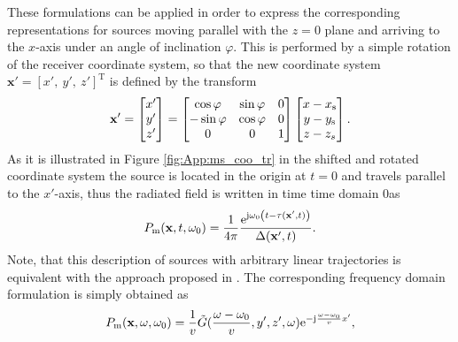 These formulations can be applied in order to express the corresponding representations for sources moving parallel with the $z=0$ plane and arriving to the $x$-axis under an angle of inclination $\varphi$.
This is performed by a simple rotation of the receiver coordinate system, so that the new coordinate system $\mathbf{x'}= [x',\ y',\ z']^{\mathrm{T}}$ is defined by the transform
%
\begin{equation}
\mathbf{x}'=
\begin{bmatrix} x' \\ y' \\ z' \end{bmatrix}
=
\begin{bmatrix}
\cos\varphi  &  \sin\varphi & 0\\
-\sin\varphi & \cos\varphi &0\\
0       &   0 &   1
\end{bmatrix}
\begin{bmatrix} x-x_\mathrm{s} \\ y-y_\mathrm{s} \\ z -z_s \end{bmatrix}.
\label{eq:transform_matrix}
\end{equation} 
%
As it is illustrated in Figure \ref{fig:App:ms_coo_tr} in the shifted and rotated coordinate system the source is located in the origin at $t = 0$ and travels parallel to the $x'$-axis, thus the radiated field is written in time time domain 0as
\begin{equation}
P_{\mathrm{m}}(\mathbf{x},t,\omega_0) = \frac{1}{4\pi} \frac{\mathrm{e}^{\mathrm{j} \omega_0 \left(t - \tau(\mathbf{x}',t) \right)}}{\Delta(\mathbf{x}',t)}.
\label{eq:inclined_field}
\end{equation}
Note, that this description of sources with arbitrary linear trajectories is equivalent with the approach proposed in \cite{Ahrens2008moving}.
The corresponding frequency domain formulation is simply obtained as
\begin{equation}
P_{\mathrm{m}}(\mathbf{x},\omega,\omega_0) =
\frac{1}{v}
\tilde{G}(\frac{\omega-\omega_0}{v}, y', z', \omega)
\mathrm{e}^{-\mathrm{j} \frac{\omega-\omega_0}{v} x'},
\label{eq:inclined_field_omega}
\end{equation}

